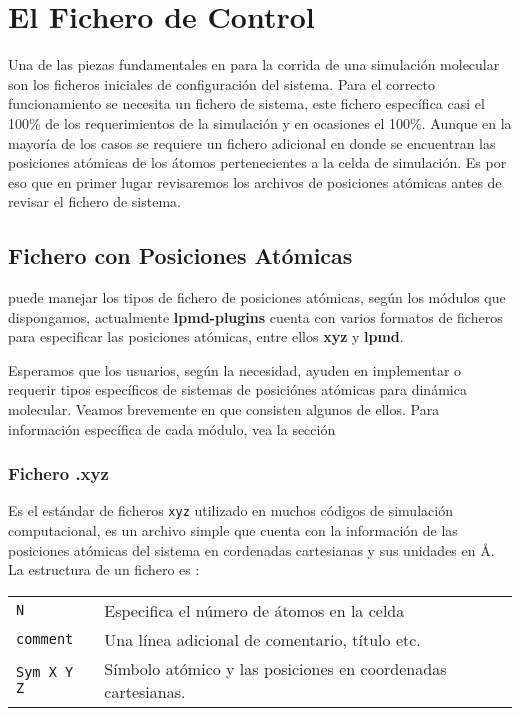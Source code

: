 \chapter{El Fichero de Control}
\label{chap:input}

Una de las piezas fundamentales en \lpmd para la corrida de una simulaci\'on molecular son los ficheros iniciales de configuraci\'on del sistema. Para el correcto funcionamiento se necesita un fichero de sistema, este fichero espec\'ifica casi el 100\% de los requerimientos de la simulaci\'on y en ocasiones el 100\%. Aunque en la mayor\'ia de los casos se requiere un fichero adicional en donde se encuentran las posiciones at\'omicas de los \'atomos pertenecientes a la celda de simulaci\'on. Es por eso que en primer lugar revisaremos los archivos de posiciones at\'omicas antes de revisar el fichero de sistema.

\section{Fichero con Posiciones At\'omicas}

\lpmd puede manejar los tipos de fichero de posiciones at\'omicas, seg\'un los m\'odulos que dispongamos, actualmente \textbf{lpmd-plugins} cuenta con varios formatos de ficheros para especificar las posiciones at\'omicas, entre ellos \textbf{xyz} y \textbf{lpmd}.

Esperamos que los usuarios, seg\'un la necesidad, ayuden en implementar o requerir tipos espec\'ificos de sistemas de posici\'ones at\'omicas para din\'amica molecular. Veamos brevemente en que consisten algunos de ellos. Para informaci\'on espec\'ifica de cada m\'odulo, vea la secci\'on~\cite{chap:modulos:entradasalida}

\subsection{Fichero .xyz}

Es el est\'andar de ficheros \verb|xyz| utilizado en muchos c\'odigos de simulaci\'on computacional, es un archivo simple que cuenta con la informaci\'on de las posiciones at\'omicas del sistema en cordenadas cartesianas y sus unidades en \AA. La estructura de un fichero es :
\begin{center}
\begin{tabular}{l|l}
 \verb|N| & Especifica el n\'umero de \'atomos en la celda \\
 \verb|comment| & Una l\'inea adicional de comentario, t\'itulo etc. \\
 \verb|Sym X Y Z| & S\'imbolo at\'omico y las posiciones en coordenadas cartesianas. \\
\end{tabular}
\end{center}

